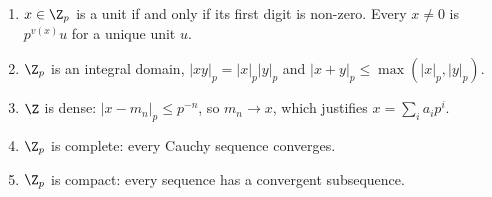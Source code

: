 \begin{proposition}\label{prop:Zp}
\begin{enumerate}[label=(\alph*)]
\item $x\in\Z_p$ is a unit if and only if its first digit is non-zero. Every $x\ne0$ is $p^{v(x)}u$ for a unique unit $u$.
\item $\Z_p$ is an integral domain, $|xy|_p=|x|_p|y|_p$ and $|x+y|_p\le\max(|x|_p,|y|_p)$.
\item $\Z$ is dense: $|x-m_n|_p\le p^{-n}$, so $m_n\to x$, which justifies $x=\sum_ia_ip^i$.
\item $\Z_p$ is complete: every Cauchy sequence converges.
\item $\Z_p$ is compact: every sequence has a convergent subsequence.
\end{enumerate}
\end{proposition}
